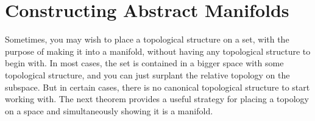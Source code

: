 
\section{Constructing Abstract Manifolds}

Sometimes, you may wish to place a topological structure on a set, with the purpose of making it into a manifold, without having any topological structure to begin with. In most cases, the set is contained in a bigger space with some topological structure, and you can just surplant the relative topology on the subspace. But in certain cases, there is no canonical topological structure to start working with. The next theorem provides a useful strategy for placing a topology on a space and simultaneously showing it is a manifold.

